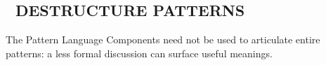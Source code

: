 \subsection*{💎 DESTRUCTURE PATTERNS{\hfill\cognitive}}
The {\sc Pattern Language Components} need not be used to articulate
entire patterns: a less formal discussion can surface useful meanings.
